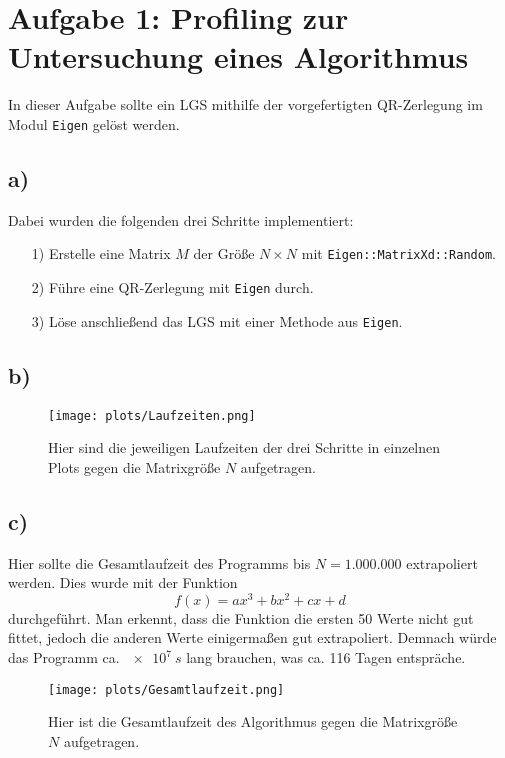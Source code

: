 \newpage
\section{Aufgabe 1: Profiling zur Untersuchung eines Algorithmus}
\label{sec:auf1}
In dieser Aufgabe sollte ein LGS mithilfe der vorgefertigten QR-Zerlegung im Modul \verb|Eigen| gelöst werden.

\subsection{a)}
    Dabei wurden die folgenden drei Schritte implementiert:
    \begin{itemize}
        \item[1)] Erstelle eine Matrix $M$ der Größe $N \times N$ mit \verb|Eigen::MatrixXd::Random|.
        \item[2)] Führe eine QR-Zerlegung mit \verb|Eigen| durch.
        \item[3)] Löse anschließend das LGS mit einer Methode aus \verb|Eigen|.
    \end{itemize}

\subsection{b)}
    \vspace{-0.5cm}
    \begin{figure}[H]
        \centering
        \texttt{[image: plots/Laufzeiten.png]} \vspace*{-0.5cm}
        \caption{Hier sind die jeweiligen Laufzeiten der drei Schritte in einzelnen Plots gegen die Matrixgröße $N$ aufgetragen.}
        \label{fig:Laufzeiten}
    \end{figure}
    \FloatBarrier

\subsection{c)}
    Hier sollte die Gesamtlaufzeit des Programms bis $N=1.000.000$ extrapoliert werden.
    Dies wurde mit der Funktion
    \begin{equation}
        f(x) = ax^3 + bx^2 + cx + d
    \end{equation}
    durchgeführt.
    Man erkennt, dass die Funktion die ersten 50 Werte nicht gut fittet, jedoch die anderen Werte einigermaßen gut extrapoliert.
    Demnach würde das Programm ca. $\SI{e7}{s}$ lang brauchen, was ca. 116 Tagen entspräche.
    \begin{figure}[H]
        \centering
        \texttt{[image: plots/Gesamtlaufzeit.png]} \vspace*{-0.5cm}
        \caption{Hier ist die Gesamtlaufzeit des Algorithmus gegen die Matrixgröße $N$ aufgetragen.}
        \label{fig:Gesamtlaufzeit}
    \end{figure}

